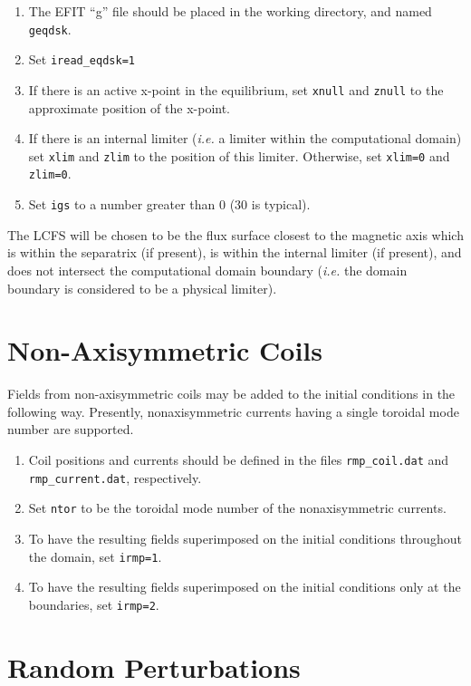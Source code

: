 \documentclass[letterpaper]{book}
\begin{document}
\begin{enumerate}
\item The EFIT ``g'' file should be placed in the working directory,
  and named \texttt{geqdsk}.
\item Set \texttt{iread\_eqdsk=1}
\item If there is an active x-point in the equilibrium, set
  \texttt{xnull} and \texttt{znull} to the approximate position of the
  x-point.
\item If there is an internal limiter (\emph{i.e.} a limiter within
  the computational domain) set \texttt{xlim} and \texttt{zlim} to the
  position of this limiter.  Otherwise, set \texttt{xlim=0} and
  \texttt{zlim=0}.
\item Set \texttt{igs} to a number greater than 0 (30 is typical).
\end{enumerate}

The LCFS will be chosen to be the flux surface closest to the magnetic
axis which is within the separatrix (if present), is within the
internal limiter (if present), and does not intersect the
computational domain boundary (\textit{i.e.} the domain boundary is
considered to be a physical limiter).


\section{Non-Axisymmetric Coils}

Fields from non-axisymmetric coils may be added to the initial
conditions in the following way.  Presently, nonaxisymmetric currents
having a single toroidal mode number are supported.

\begin{enumerate}
\item Coil positions and currents should be defined in the files
  \texttt{rmp\_coil.dat} and \texttt{rmp\_current.dat}, respectively.
\item Set \texttt{ntor} to be the toroidal mode number of the
  nonaxisymmetric currents.
\item To have the resulting fields superimposed on the initial
  conditions throughout the domain, set \texttt{irmp=1}.
\item To have the resulting fields superimposed on the initial
  conditions only at the boundaries, set \texttt{irmp=2}.
\end{enumerate}


\section{Random Perturbations}
\end{document}
